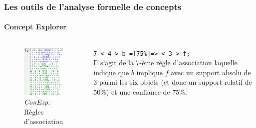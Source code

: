 \documentclass[french]{beamer}
\begin{document}
\begin{frame}
\frametitle{Les outils de l'analyse formelle de concepts}
\framesubtitle{Concept Explorer}
\begin{columns}[c]
\begin{figure}[H]
\label{cap:fig:conexp-associations}
\begin{center}\includegraphics[scale=0.45]{figures/conexp-associations.png}\end{center}
\caption{\emph{ConExp}: Règles d'association}
\end{figure}
\color{green!40!teal}
\texttt{7 < 4 > b =[75\%]=> < 3 > f;} \\
\color{black}
Il s'agit de la 7-ème règle d'association laquelle indique que $b$ implique $f$ avec un support absolu de 3 parmi les six objets (et donc un support relatif de $50 \%$) et une confiance de $75 \%$.
\end{columns}
\end{frame}
\end{document}
